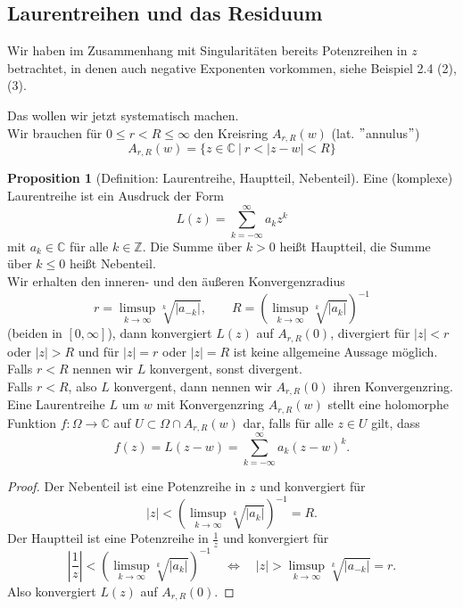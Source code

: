 \documentclass[11pt,titlepage]{article}
\theoremstyle{definition}
\newtheorem{proposition}[theorem]{Proposition}
\theoremstyle{remark}
\begin{document}
	\subsection{Laurentreihen und das Residuum}
	
	Wir haben im Zusammenhang mit Singularitäten bereits Potenzreihen in $z$ betrachtet, in denen auch 
	negative Exponenten vorkommen, siehe Beispiel 2.4 (2),(3). 
	
	
	Das wollen wir jetzt systematisch machen. \\
	Wir brauchen für $0\leq r<R\leq \infty$ den Kreisring $A_{r,R}(w)$ (lat. $"$annulus$"$)
	\[ A_{r,R}(w)=\{z\in\mathbb{C} \ \vert\ r<|z-w|<R\} \]
	
	\begin{proposition}[Definition: Laurentreihe, Hauptteil, Nebenteil]
		Eine (komplexe) Laurentreihe ist ein Ausdruck der Form
		\[ L(z) =\sum_{k=-\infty}^{\infty} a_k z^k \]
		mit $a_k\in\mathbb{C}$ für alle $k\in\mathbb{Z}$. Die Summe über $k>0$ heißt Hauptteil, die Summe 
		über $k\leq 0$ heißt Nebenteil. \\
		Wir erhalten den inneren- und den äußeren Konvergenzradius
		\[ r=\limsup_{k\to\infty}\sqrt[k]{|a_{-k}|},\qquad R=\left(\limsup_{k\to\infty} \sqrt[k]{|a_k|}\right)^{-1} \]
		(beiden in $[0,\infty]$), dann konvergiert $L(z)$ auf $A_{r,R}(0)$, divergiert für $|z|<r$ oder 
		$|z|>R$ und für $|z|=r$ oder $|z|=R$ ist keine allgemeine Aussage möglich. \\
		Falls $r<R$ nennen wir $L$ konvergent, sonst divergent. \\
		Falls $r<R$, also $L$ konvergent, dann nennen wir $A_{r,R}(0)$ ihren Konvergenzring. \\
		Eine Laurentreihe $L$ um $w$ mit Konvergenzring $A_{r,R}(w)$ stellt eine holomorphe 
		Funktion $f:\Omega\to\mathbb{C}$ auf $U\subset\Omega\cap A_{r,R}(w)$ dar, falls für alle 
		$z\in U$ gilt, dass
		\[ f(z) = L(z-w) =\sum_{k=-\infty}^{\infty} a_k (z-w)^k. \]
	\end{proposition}
	
	\begin{proof}
		Der Nebenteil ist eine Potenzreihe in $z$ und konvergiert für 
		\[|z|<\left(\limsup_{k\to\infty} \sqrt[k]{|a_k|}\right)^{-1}=R.\]
		Der Hauptteil ist eine Potenzreihe in $\frac{1}{z}$ und konvergiert für
		\[ \left|\frac{1}{z}\right| < \left(\limsup_{k\to\infty} \sqrt[k]{|a_k|}\right)^{-1} \quad\Leftrightarrow\quad
		|z| > \limsup_{k\to\infty} \sqrt[k]{|a_{-k}|} =r. \]
		Also konvergiert $L(z)$ auf $A_{r,R}(0)$.
	\end{proof}
	
\end{document}

